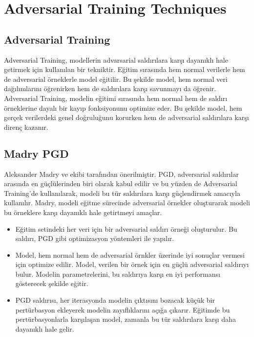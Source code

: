 \section{Adversarial Training Techniques}

\subsection{Adversarial Training}

Adversarial Training, modellerin advarsarial saldırılara karşı dayanıklı hale getirmek için kullanılan bir tekniktir. Eğitim sırasında hem normal verilerle hem de adversarial örneklerle model eğitilir. Bu şekilde model, hem normal veri dağılımlarını öğrenirken hem de saldırılara karşı savunmayı da öğrenir. Adversarial Training, modelin eğitimi sırasında hem normal hem de saldırı örneklerine dayalı bir kayıp fonksiyonunu optimize eder. Bu şekilde model, hem gerçek verilerdeki genel doğruluğunu korurken hem de adversarial saldırılara karşı direnç kazanır.

\newpage

\subsection{Madry PGD}

Aleksander Madry ve ekibi tarafından önerilmiştir. PGD, adversarial saldırılar arasında en güçlülerinden biri olarak kabul edilir ve bu yüzden de Adversarial Training'de kullanılarak, modeli bu tür saldırılara karşı güçlendirmek amacıyla kullanılır. Madry, modeli eğitme sürecinde adversarial örnekler oluşturarak modeli bu örneklere karşı dayanıklı hale getirtmeyi amaçlar. 

\begin{itemize}
    \item Eğitim setindeki her veri için bir adversarial saldırı örneği oluşturulur. Bu saldırı, PGD gibi optimizasyon yöntemleri ile yapılır.
    \item Model, hem normal hem de adversarial örnkler üzerinde iyi sonuçlar vermesi için optimize edilir. Model, verilen bir örnek için en güçlü adversarial saldırıyı bulur. Modelin parametrelerini, bu saldırıya karşı en iyi performansı gösterecek şekilde eğitir.
    \item PGD saldırısı, her iterasyonda modelin çıktısını bozacak küçük bir pertürbasyon ekleyerek modelin zayıflıklarını açığa çıkarır. Eğitimde bu pertürbasyonlarla karşılaşan model, zamanla bu tür saldırılara karşı daha dayanıklı hale gelir.
\end{itemize}

